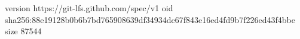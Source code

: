 version https://git-lfs.github.com/spec/v1
oid sha256:88e19128b0b6b7bd765908639df34934dc67f843e16ed4fd9b7f226ed43f4bbe
size 87544
